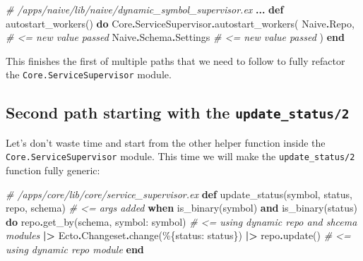 \documentclass[
]{book}
\newenvironment{Shaded}{\begin{snugshade}}{\end{snugshade}}
\newcommand{\CommentTok}[1]{\textcolor[rgb]{0.56,0.35,0.01}{\textit{#1}}}
\newcommand{\ConstantTok}[1]{\textcolor[rgb]{0.00,0.00,0.00}{#1}}
\newcommand{\KeywordTok}[1]{\textcolor[rgb]{0.13,0.29,0.53}{\textbf{#1}}}
\newcommand{\NormalTok}[1]{#1}
\newcommand{\OperatorTok}[1]{\textcolor[rgb]{0.81,0.36,0.00}{\textbf{#1}}}
\newcommand{\VariableTok}[1]{\textcolor[rgb]{0.00,0.00,0.00}{#1}}
\begin{document}
\begin{Shaded}
\begin{Highlighting}[]
  \CommentTok{\# /apps/naive/lib/naive/dynamic\_symbol\_supervisor.ex}
  \OperatorTok{...}
  \KeywordTok{def}\NormalTok{ autostart\_workers() }\KeywordTok{do}
    \ConstantTok{Core}\OperatorTok{.}\ConstantTok{ServiceSupervisor}\OperatorTok{.}\NormalTok{autostart\_workers(}
      \ConstantTok{Naive}\OperatorTok{.}\ConstantTok{Repo}\NormalTok{,           }\CommentTok{\# \textless{}= new value passed}
      \ConstantTok{Naive}\OperatorTok{.}\ConstantTok{Schema}\OperatorTok{.}\ConstantTok{Settings} \CommentTok{\# \textless{}= new value passed}
\NormalTok{    )}
  \KeywordTok{end}
\end{Highlighting}
\end{Shaded}

This finishes the first of multiple paths that we need to follow to fully refactor the \texttt{Core.ServiceSupervisor} module.

\hypertarget{second-path-starting-with-the-update_status2}{%
\subsection{\texorpdfstring{Second path starting with the \texttt{update\_status/2}}{Second path starting with the update\_status/2}}\label{second-path-starting-with-the-update_status2}}

Let's don't waste time and start from the other helper function inside the \texttt{Core.ServiceSupervisor} module. This time we will make the \texttt{update\_status/2} function fully generic:

\begin{Shaded}
\begin{Highlighting}[]
  \CommentTok{\# /apps/core/lib/core/service\_supervisor.ex}
  \KeywordTok{def}\NormalTok{ update\_status(symbol, status, repo, schema) }\CommentTok{\# \textless{}= args added}
      \KeywordTok{when}\NormalTok{ is\_binary(symbol) }\KeywordTok{and}\NormalTok{ is\_binary(status) }\KeywordTok{do}
\NormalTok{    repo}\OperatorTok{.}\NormalTok{get\_by(schema, }\VariableTok{symbol:}\NormalTok{ symbol) }\CommentTok{\# \textless{}= using dynamic repo and shcema modules}
    \OperatorTok{|\textgreater{}} \ConstantTok{Ecto}\OperatorTok{.}\ConstantTok{Changeset}\OperatorTok{.}\NormalTok{change(\%\{}\VariableTok{status:}\NormalTok{ status\})}
    \OperatorTok{|\textgreater{}}\NormalTok{ repo}\OperatorTok{.}\NormalTok{update() }\CommentTok{\# \textless{}= using dynamic repo module}
  \KeywordTok{end}
\end{Highlighting}
\end{Shaded}
\end{document}
